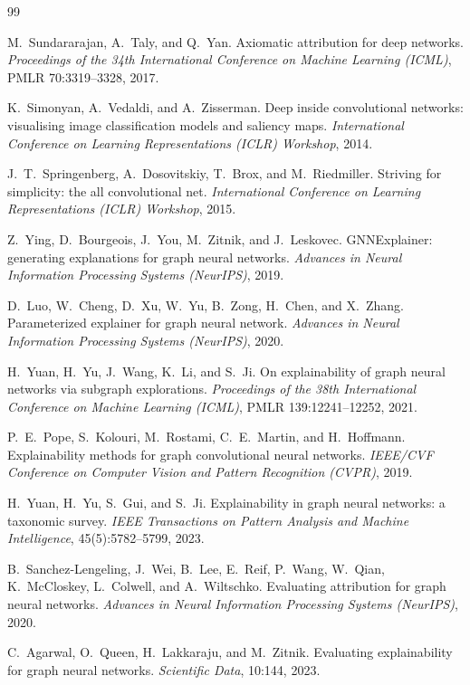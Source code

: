 \clearpage
\begin{thebibliography}{99}
\footnotesize
\setlength{\itemsep}{1.5pt}\setlength{\parskip}{0pt}

 M.~Sundararajan, A.~Taly, and Q.~Yan. Axiomatic attribution for
deep networks. \emph{Proceedings of the 34th International Conference on
Machine Learning (ICML)}, PMLR 70:3319--3328, 2017.

 K.~Simonyan, A.~Vedaldi, and A.~Zisserman. Deep inside
convolutional networks: visualising image classification models and saliency
maps. \emph{International Conference on Learning Representations (ICLR)
Workshop}, 2014.

 J.~T.~Springenberg, A.~Dosovitskiy, T.~Brox, and
M.~Riedmiller. Striving for simplicity: the all convolutional net.
\emph{International Conference on Learning Representations (ICLR) Workshop},
2015.

 Z.~Ying, D.~Bourgeois, J.~You, M.~Zitnik, and
J.~Leskovec. GNNExplainer: generating explanations for graph neural networks.
\emph{Advances in Neural Information Processing Systems (NeurIPS)}, 2019.

 D.~Luo, W.~Cheng, D.~Xu, W.~Yu, B.~Zong, H.~Chen, and
X.~Zhang. Parameterized explainer for graph neural network. \emph{Advances in
Neural Information Processing Systems (NeurIPS)}, 2020.

 H.~Yuan, H.~Yu, J.~Wang, K.~Li, and S.~Ji. On
explainability of graph neural networks via subgraph explorations.
\emph{Proceedings of the 38th International Conference on Machine Learning
(ICML)}, PMLR 139:12241--12252, 2021.

 P.~E.~Pope, S.~Kolouri, M.~Rostami, C.~E.~Martin, and
H.~Hoffmann. Explainability methods for graph convolutional neural networks.
\emph{IEEE/CVF Conference on Computer Vision and Pattern Recognition (CVPR)},
2019.

 H.~Yuan, H.~Yu, S.~Gui, and S.~Ji. Explainability in graph
neural networks: a taxonomic survey. \emph{IEEE Transactions on Pattern
Analysis and Machine Intelligence}, 45(5):5782--5799, 2023.

 B.~Sanchez-Lengeling, J.~Wei, B.~Lee, E.~Reif,
P.~Wang, W.~Qian, K.~McCloskey, L.~Colwell, and A.~Wiltschko. Evaluating
attribution for graph neural networks. \emph{Advances in Neural Information
Processing Systems (NeurIPS)}, 2020.

 C.~Agarwal, O.~Queen, H.~Lakkaraju, and M.~Zitnik.
Evaluating explainability for graph neural networks. \emph{Scientific Data},
10:144, 2023.


\end{thebibliography}

